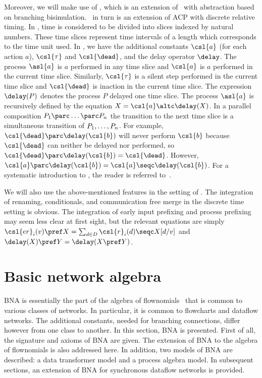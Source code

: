 \documentclass[fleqn]{llncs}
\begin{document}
Moreover, we will make use of \acpdrtt, which is an extension of 
\acpdrt\ with abstraction based on branching bisimulation.
\acpdrt\ in turn is an extension of ACP with discrete relative timing.
In \acpdrtt, time is considered to be divided into slices indexed by 
natural numbers.
These time slices represent time intervals of a length which corresponds
to the time unit used.
In \acpdrtt, we have the additional constants $\csl{a}$ (for each action 
$a$), $\csl{\tau}$ and $\csl{\dead}$, and the delay operator $\delay$.
The process $\asl{a}$ is $a$ performed in any time slice and $\csl{a}$
is $a$ performed in the current time slice.
Similarly, $\csl{\tau}$ is a silent step performed in the current time
slice and $\csl{\dead}$ is inaction in the current time slice.
The expression $\delay(P)$ denotes the process $P$ delayed one time 
slice.
The process $\asl{a}$ is recursively defined by the equation
$X = \csl{a} \altc \delay(X)$.
In a parallel composition $P\sb1 \parc \dots \parc P\sb{n}$ the
transition to the next time slice is a simultaneous transition of 
$P\sb1, \dots, P\sb{n}$.
For example, $\csl{\dead} \parc \delay(\csl{b})$ will never perform
$\csl{b}$ because $\csl{\dead}$ can neither be delayed nor performed, so
$\csl{\dead} \parc \delay(\csl{b}) = \csl{\dead}$.
However, $\csl{a} \parc \delay(\csl{b}) = \csl{a} \seqc \delay(\csl{b})$.
For a systematic introduction to \acpdrtt, the reader is referred
to~\cite{BM02a}.

We will also use the above-mentioned features in the setting of \acpdrtt.
The integration of renaming, conditionals, and communication free merge 
in the discrete time setting is obvious.
The integration of early input prefixing and process prefixing may seem 
less clear at first sight, but the relevant equations are simply
$\csl{er}_i(v) \pref X = \sum_{d \in D} \csl{r}_i(d) \seqc X[d/v]$ and
$\delay(X) \pref Y = \delay(X \pref Y)$.

\section{Basic network algebra}
\label{bna}
BNA is essentially the part of the algebra of flownomials~\cite{CS90}
that is common to various classes of networks.
In particular, it is common to flowcharts and dataflow networks.
The additional constants, needed for branching connections, differ
however from one class to another.
In this section, BNA is presented.
First of all, the signature and axioms of BNA are given.
The extension of BNA to the algebra of flownomials is also addressed
here.
In addition, two models of BNA are described: a data transformer model
and a process algebra model.
In subsequent sections, an extension of BNA for synchronous dataflow 
networks is provided.
\end{document}
